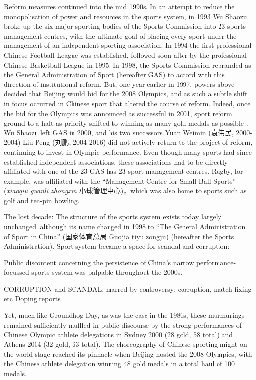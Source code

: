   Reform measures continued into the mid 1990s. In an attempt to reduce the monopolisation of power and resources in the sports system, in 1993 Wu Shaozu broke up the six major sporting bodies of the Sports Commission into 23 sports management centres, with the ultimate goal of placing every sport under the management of an independent sporting association. In 1994 the first professional Chinese Football League was established, followed soon after by the professional Chinese Basketball League in 1995. In 1998, the Sports Commission rebranded as the General Administration of Sport (hereafter GAS) to accord with this direction of institutional reform.  But, one year earlier in 1997, powers above decided that Beijing would bid for the 2008 Olympics, and as such a subtle shift in focus occurred in Chinese sport that altered the course of reform.  Indeed, once the bid for the Olympics was announced as successful in 2001, sport reform ground to a halt as priority shifted to winning as many gold medals as possible \citep{News2017}.  Wu Shaozu left GAS in 2000, and his two successors Yuan Weimin (袁伟民, 2000-2004) Liu Peng
  (刘鹏, 2004-2016) did not actively return to the project of reform, continuing to invest in Olympic performance.  Even though many sports had since established independent associations, these associations had to be directly affiliated with one of the 23 GAS has 23 sport management centres. Rugby, for example, was affiliated with the ``Management Centre for Small Ball Sports'' (\textit{xiaoqiu guanli zhongxin} 小球管理中心)，which was also home to sports such as golf and ten-pin bowling.


  The lost decade:
  The structure of the sports system exists today largely unchanged, although its name changed in 1998 to “The General Administration of Sport in China” (国家体育总局 Guojia tiyu zongju) (hereafter the Sports Administration).
  Sport system became a space for scandal and corruption:

  Public discontent concerning the persistence of China's narrow performance-focussed sports system was palpable throughout the 2000s.

  CORRUPTION and SCANDAL:
  marred by controversy:
  corruption, match fixing etc
  Doping reports

  Yet, much like Groundhog Day, as was the case in the 1980s, these murmurings remained sufficiently muffled in public discourse by the strong performances of Chinese Olympic athlete delegations in Sydney 2000 (28 gold, 58 total) and Athens 2004 (32 gold, 63 total). The choreography of Chinese sporting might on the world stage reached its pinnacle when Beijing hosted the 2008 Olympics, with the Chinese athlete delegation winning 48 gold medals in a total haul of 100 medals.

